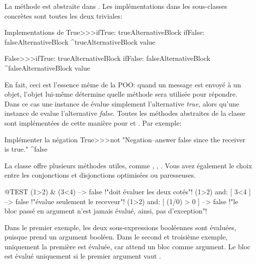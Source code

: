 \documentclass[a4paper,10pt,twoside]{book}
\begin{document}
La méthode est abstraite dans .
Les implémentations dans les sous-classes concrètes sont toutes les deux triviales:

\begin{method}{Implementations de }
True>>>ifTrue: trueAlternativeBlock ifFalse: falseAlternativeBlock 
    ^trueAlternativeBlock value

False>>>ifTrue: trueAlternativeBlock ifFalse: falseAlternativeBlock 
    ^falseAlternativeBlock value
\end{method}

En fait, ceci est l'essence même de la POO: quand un message est envoyé à un objet, l'objet lui-même détermine quelle méthode sera utilisée pour répondre. Dans ce cas une instance de   évalue simplement l'alternative \emph{true}, alors qu'une instance de  evalue l'alternative \emph{false}.  Toutes les méthodes abstraites de la classe  sont implémentées de cette manière pour  et . Par exemple:

\begin{method}{Implémenter la négation}
True>>>not
    "Negation--answer false since the receiver is true."
    ^false
\end{method}

La classe  offre plusieurs méthodes utiles, comme , , . Vous avez également le choix entre les conjonctions et disjonctions optimisées ou paresseuses.

\begin{code}{@TEST}
(1>2) & (3<4)              --> false    !"doit évaluer les deux cotés"!
(1>2) and: [ 3<4 ]        --> false    !"évalue seulement le receveur"!
(1>2) and: [ (1/0) > 0 ] --> false    !"le bloc passé en argument n'est jamais évalué, ainsi, pas d'exception"!
\end{code}

Dans le premier exemple, les deux sous-expressions booléennes sont évaluées, puisque  prend un argument booléen.
Dans le second et troisième exemple, uniquement la première est évaluée, car  attend un  bloc comme argument. Le  bloc est évalué uniquement si le premier argument vaut .

\end{document}
